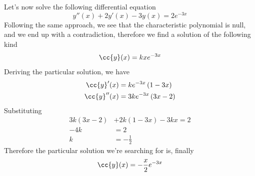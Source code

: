 \documentclass[../mmf.tex]{subfiles}
\begin{document}
\begin{eg}
	Let's now solve the following differential equation
	\begin{equation*}
		y''(x)+2y'(x)-3y(x)=2e^{-3x}
	\end{equation*}
	Following the same approach, we see that the characteristic polynomial is null, and we end up with a contradiction, therefore we find a solution of the following kind
	\begin{equation*}
		\cc{y}(x)=kxe^{-3x}
	\end{equation*}
	Deriving the particular solution, we have
	\begin{equation*}
		\begin{aligned}
			\cc{y}'(x)&=ke^{-3x}\left( 1-3x \right)\\
			\cc{y}''(x)&=3ke^{-3x}\left( 3x-2 \right)
		\end{aligned}
	\end{equation*}
	Substituting
	\begin{equation*}
		\begin{aligned}
			3k(3x-2)&+2k(1-3x)-3kx=2\\
			-4k&=2\\
			k&=-\frac{1}{2}
		\end{aligned}
	\end{equation*}
	Therefore the particular solution we're searching for is, finally
	\begin{equation*}
		\cc{y}(x)=-\frac{x}{2}e^{-3x}
	\end{equation*}
\end{eg}
\end{document}
